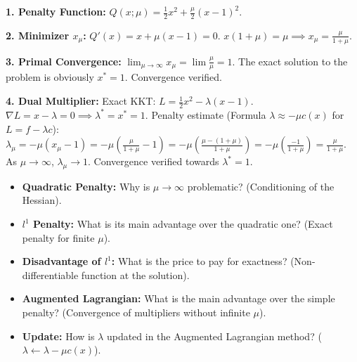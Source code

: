 \begin{correction}
\textbf{1. Penalty Function:}
$Q(x; \mu) = \frac{1}{2}x^2 + \frac{\mu}{2}(x-1)^2$.

\textbf{2. Minimizer $x_\mu$:}
$Q'(x) = x + \mu(x-1) = 0$.
$x(1+\mu) = \mu \implies x_\mu = \frac{\mu}{1+\mu}$.

\textbf{3. Primal Convergence:}
$\lim_{\mu \to \infty} x_\mu = \lim \frac{\mu}{\mu} = 1$.
The exact solution to the problem is obviously $x^*=1$. Convergence verified.

\textbf{4. Dual Multiplier:}
Exact KKT: $L = \frac{1}{2}x^2 - \lambda(x-1)$. $\nabla L = x - \lambda = 0 \implies \lambda^* = x^* = 1$.
Penalty estimate (Formula $\lambda \approx -\mu c(x)$ for $L = f - \lambda c$):
$\lambda_\mu = -\mu (x_\mu - 1) = -\mu (\frac{\mu}{1+\mu} - 1) = -\mu (\frac{\mu - (1+\mu)}{1+\mu}) = -\mu (\frac{-1}{1+\mu}) = \frac{\mu}{1+\mu}$.
As $\mu \to \infty$, $\lambda_\mu \to 1$.
Convergence verified towards $\lambda^* = 1$.
\end{correction}
\bigskip

\bigskip
\begin{checkpoint}
\begin{itemize}
    \item \textbf{Quadratic Penalty:} Why is $\mu \to \infty$ problematic? (Conditioning of the Hessian).
    \item \textbf{$l^1$ Penalty:} What is its main advantage over the quadratic one? (Exact penalty for finite $\mu$).
    \item \textbf{Disadvantage of $l^1$:} What is the price to pay for exactness? (Non-differentiable function at the solution).
    \item \textbf{Augmented Lagrangian:} What is the main advantage over the simple penalty? (Convergence of multipliers without infinite $\mu$).
    \item \textbf{Update:} How is $\lambda$ updated in the Augmented Lagrangian method? ($\lambda \leftarrow \lambda - \mu c(x)$).
\end{itemize}
\end{checkpoint}
